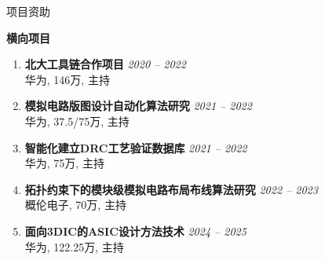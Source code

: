\begin{rSection}{项目资助}
\begin{enumerate}[font=\normalfont]
\end{enumerate}
    
\textbf{横向项目}
        
\begin{enumerate}[font=\normalfont]

\item 
{\bf 北大工具链合作项目 } \hfill{\em 2020 -- 2022} \\
华为, 146万, 主持

\item 
{\bf 模拟电路版图设计自动化算法研究 } \hfill{\em 2021 -- 2022} \\
华为, 37.5/75万, 主持

\item 
{\bf 智能化建立DRC工艺验证数据库 } \hfill{\em 2021 -- 2022} \\
华为, 75万, 主持

\item 
{\bf 拓扑约束下的模块级模拟电路布局布线算法研究 } \hfill{\em 2022 -- 2023} \\
概伦电子, 70万, 主持

\item 
{\bf 面向3DIC的ASIC设计方法技术 } \hfill{\em 2024 -- 2025} \\
华为, 122.25万, 主持

\end{enumerate}

\end{rSection}
